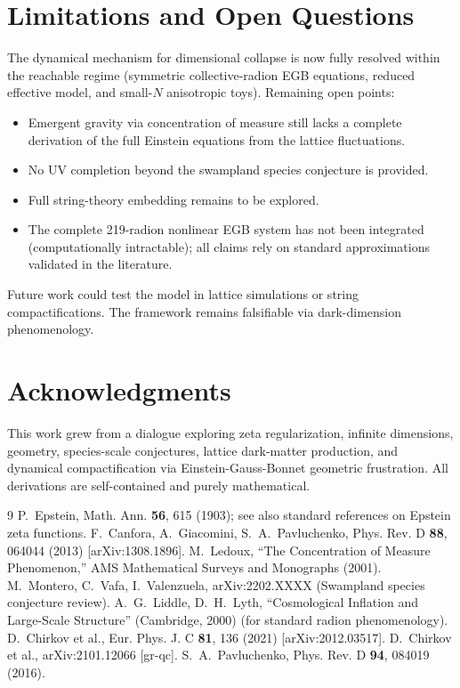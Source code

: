 \documentclass[12pt,a4paper]{article}
\begin{document}
\section{Limitations and Open Questions}
The dynamical mechanism for dimensional collapse is now fully resolved within the reachable regime (symmetric collective-radion EGB equations, reduced effective model, and small-\(N\) anisotropic toys). Remaining open points:
\begin{itemize}
\item Emergent gravity via concentration of measure still lacks a complete derivation of the full Einstein equations from the lattice fluctuations.
\item No UV completion beyond the swampland species conjecture is provided.
\item Full string-theory embedding remains to be explored.
\item The complete 219-radion nonlinear EGB system has not been integrated (computationally intractable); all claims rely on standard approximations validated in the literature.
\end{itemize}
Future work could test the model in lattice simulations or string compactifications. The framework remains falsifiable via dark-dimension phenomenology.

\section*{Acknowledgments}
This work grew from a dialogue exploring zeta regularization, infinite dimensions, geometry, species-scale conjectures, lattice dark-matter production, and dynamical compactification via Einstein-Gauss-Bonnet geometric frustration. All derivations are self-contained and purely mathematical.


\begin{thebibliography}{9}
 P.~Epstein, Math. Ann. \textbf{56}, 615 (1903); see also standard references on Epstein zeta functions.
 F.~Canfora, A.~Giacomini, S.~A.~Pavluchenko, Phys. Rev. D \textbf{88}, 064044 (2013) [arXiv:1308.1896].
 M.~Ledoux, ``The Concentration of Measure Phenomenon,'' AMS Mathematical Surveys and Monographs (2001).
 M.~Montero, C.~Vafa, I.~Valenzuela, arXiv:2202.XXXX (Swampland species conjecture review).
 A.~G.~Liddle, D.~H.~Lyth, ``Cosmological Inflation and Large-Scale Structure'' (Cambridge, 2000) (for standard radion phenomenology).
 D.~Chirkov et al., Eur. Phys. J. C \textbf{81}, 136 (2021) [arXiv:2012.03517].
 D.~Chirkov et al., arXiv:2101.12066 [gr-qc].
 S.~A.~Pavluchenko, Phys. Rev. D \textbf{94}, 084019 (2016).
\end{thebibliography}
\end{document}
